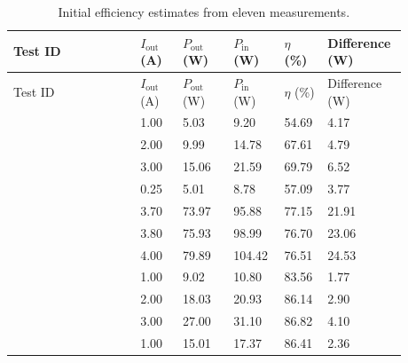 \begingroup
\scriptsize
\setlength{\tabcolsep}{3pt}
\renewcommand{\arraystretch}{1.12}
\begin{longtable}{@{}L{0.3022\linewidth} L{0.1067\linewidth} L{0.1244\linewidth} L{0.1244\linewidth} L{0.0978\linewidth} L{0.1244\linewidth}@{}}
\caption{Initial efficiency estimates from eleven measurements.}\label{tab:efficiency-results-complete}\\
\toprule
Test ID & $I_\mathrm{out}$ (A) & $P_\mathrm{out}$ (W) & $P_\mathrm{in}$ (W) & $\eta$ (\%) & Difference (W)\\
\midrule
\endfirsthead
\toprule
Test ID & $I_\mathrm{out}$ (A) & $P_\mathrm{out}$ (W) & $P_\mathrm{in}$ (W) & $\eta$ (\%) & Difference (W)\\
\midrule
\endhead
{} & 1.00 & 5.03 & 9.20 & 54.69 & 4.17\\
 & 2.00 & 9.99 & 14.78 & 67.61 & 4.79\\
 & 3.00 & 15.06 & 21.59 & 69.79 & 6.52\\
 & 0.25 & 5.01 & 8.78 & 57.09 & 3.77\\
 & 3.70 & 73.97 & 95.88 & 77.15 & 21.91\\
 & 3.80 & 75.93 & 98.99 & 76.70 & 23.06\\
 & 4.00 & 79.89 & 104.42 & 76.51 & 24.53\\
 & 1.00 & 9.02 & 10.80 & 83.56 & 1.77\\
 & 2.00 & 18.03 & 20.93 & 86.14 & 2.90\\
 & 3.00 & 27.00 & 31.10 & 86.82 & 4.10\\
 & 1.00 & 15.01 & 17.37 & 86.41 & 2.36\\
\bottomrule
\end{longtable}
\endgroup
